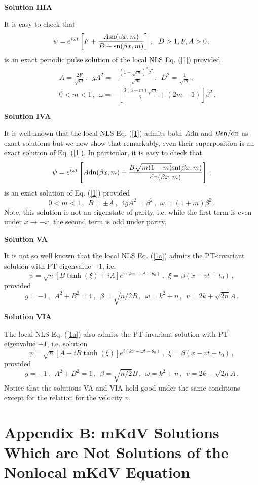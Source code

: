\documentclass[11pt]{article}
\newcommand{\be}{\begin{equation}}
\newcommand{\ee}{\end{equation}}
\newcommand{\bea}{\begin{eqnarray}}
\newcommand{\eea}{\end{eqnarray}}
\newcommand{\sn}{{\rm sn}}
\newcommand{\dn}{{\rm dn}}
\begin{document}
{\bf Solution IIIA}

It is easy to check that 
\be\label{A5}
\psi = e^{i\omega t} \left[F+\frac{A\sn(\beta x,m)}{D+\sn(\beta x,m)}\right]\,,
~~D > 1,F,A > 0\,,
\ee
is an exact periodic pulse solution of the local NLS Eq. (\ref{1}) provided
\bea\label{A6}
&&A = \frac{2 F}{\sqrt{m}}\,,~~g A^2 = -\frac{(1-\sqrt{m})^2 \beta^2}
{\sqrt{m}}\,,~~D^2 = \frac{1}{\sqrt{m}}\,,  \nonumber \\
&&0 < m < 1\,,~~\omega = -\left[\frac{3(3+m)\sqrt{m}}{2}+(2m-1)\right]\beta^2\,.
\eea

{\bf Solution IVA}

It is well known that the local NLS Eq. (\ref{1}) admits both 
$A\dn$ and $B\sn/\dn$ as exact solutions \cite{ks2} but we now show that 
remarkably, even their superposition is an exact solution of Eq. (\ref{1}). In 
particular, it is easy to check that
\be\label{A7}
\psi = e^{i\omega t} \left[A\dn(\beta x,m) +\frac{B\sqrt{m(1-m)}\sn(\beta x,m)}
{\dn(\beta x,m)}\right]\,,
\ee
is an exact solution of Eq. (\ref{1}) provided
\be\label{A8}
0 < m < 1\,,~~B = \pm A\,,~~4g A^2 = \beta^2\,,~~
\omega = (1+m)\beta^2\,.
\ee
Note, this solution is not an eigenstate of parity, i.e. while the first term
is even under $x \rightarrow -x$, the second term is odd under parity.

{\bf Solution VA}

It is not so well known that the local NLS Eq. (\ref{1a}) admits the 
PT-invariant solution with PT-eigenvalue $-1$, i.e. 
\be\label{A9}
\psi = \sqrt{n}[B\tanh(\xi)+iA] e^{i(kx-\omega t + \theta_0)}\,,~~\xi 
= \beta(x-vt+t_0)\,,
\ee
provided
\be\label{A10}
g = -1\,,~~A^2+B^2 = 1\,,~~\beta = \sqrt{n/2} B\,,~~\omega = k^2+n\,,~~
v = 2k +\sqrt{2n} A\,.
\ee

{\bf Solution VIA}

The local NLS Eq. (\ref{1a}) also admits the PT-invariant solution with
PT-eigenvalue +$1$, i.e.
solution
\be\label{A11}
\psi = \sqrt{n}[A+iB\tanh(\xi)] e^{i(kx-\omega t + \theta_0)}\,,~~\xi 
= \beta(x-vt+t_0)\,,
\ee
provided
\be\label{A12}
g = -1\,,~~A^2+B^2 = 1\,,~~\beta = \sqrt{n/2} B\,,~~\omega = k^2+n\,,~~
v = 2k -\sqrt{2n} A\,.
\ee
Notice that the solutions VA and VIA hold good under the same conditions
except for the relation for the velocity $v$.

\section{Appendix B: mKdV Solutions Which are Not Solutions of the Nonlocal mKdV Equation}
\end{document}
